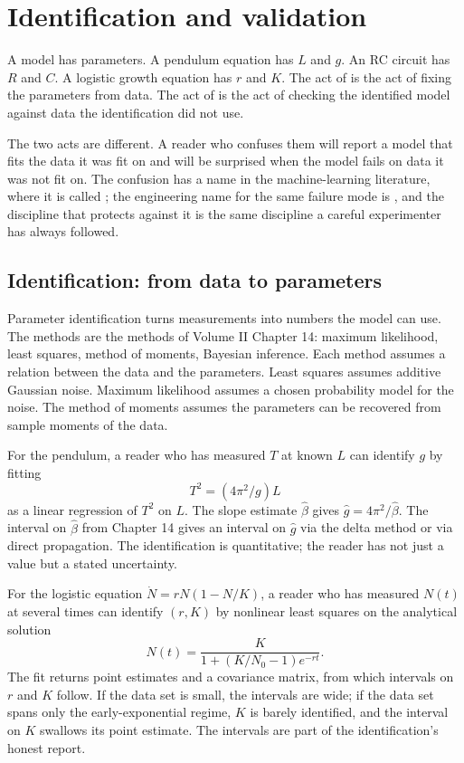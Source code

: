 \section{Identification and validation}

A model has parameters. A pendulum equation has $L$ and $g$. An RC
circuit has $R$ and $C$. A logistic growth equation has $r$ and $K$.
The act of  is the act of fixing the
parameters from data. The act of  is the act of
checking the identified model against data the identification did not
use.

The two acts are different. A reader who confuses them will report a
model that fits the data it was fit on and will be surprised when the
model fails on data it was not fit on. The confusion has a name in the
machine-learning literature, where it is called ;
the engineering name for the same failure mode is , and the discipline that protects against it
is the same discipline a careful experimenter has always followed.

\subsection{Identification: from data to parameters}

Parameter identification turns measurements into numbers the model
can use. The methods are the methods of Volume II Chapter 14:
maximum likelihood, least squares, method of moments, Bayesian
inference. Each method assumes a relation between the data and the
parameters. Least squares assumes additive Gaussian noise. Maximum
likelihood assumes a chosen probability model for the noise. The
method of moments assumes the parameters can be recovered from
sample moments of the data.

For the pendulum, a reader who has measured $T$ at known $L$ can
identify $g$ by fitting
\[
T^{2} = (4\pi^{2}/g) L
\]
as a linear regression of $T^{2}$ on $L$. The slope estimate
$\hat\beta$ gives $\hat g = 4\pi^{2}/\hat\beta$. The interval on
$\hat\beta$ from Chapter 14 gives an interval on $\hat g$ via the
delta method or via direct propagation. The identification is
quantitative; the reader has not just a value but a stated
uncertainty.

For the logistic equation $\dot N = r N (1 - N/K)$, a reader who has
measured $N(t)$ at several times can identify $(r, K)$ by nonlinear
least squares on the analytical solution
\[
N(t) = \frac{K}{1 + (K/N_{0} - 1) e^{-rt}}.
\]
The fit returns point estimates and a covariance matrix, from which
intervals on $r$ and $K$ follow. If the data set is small, the
intervals are wide; if the data set spans only the early-exponential
regime, $K$ is barely identified, and the interval on $K$ swallows
its point estimate. The intervals are part of the identification's
honest report.

